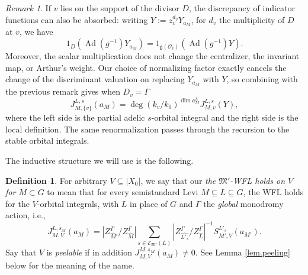 \documentclass[openany]{amsbook}
\theoremstyle{definition}
\newtheorem{definition}[theorem]{Definition}
\theoremstyle{remark}
\newtheorem{remark}[theorem]{Remark}
\numberwithin{equation}{section}
\renewcommand{\O}{\mathcal{O}}
\newcommand{\cE}{\mathcal{E}}
\renewcommand{\-}{\operatorname{-}}
\renewcommand{\a}{\mathfrak{a}}
\newcommand{\on}[1]{\operatorname{#1}}
\renewcommand{\fg}{\mathfrak{g}}
\newcommand{\fM}{\mathfrak{M}}
\newcommand{\Ad}{\on{Ad}}
\begin{document}
\begin{remark}\label{rmk.local.renorm.D}
    If $v$ lies on the support of the divisor $D$, the discrepancy of indicator functions can also be absorbed: writing $Y:= z_v^{d_v} Y_{a_M}$, for $d_v$ the multiplicity of $D$ at $v$, we have
    $$
        1_{D}(\Ad(g^{-1}) Y_{a_M}) = 1_{\fg(\O_v)}(\Ad(g^{-1}) Y).
    $$
    Moreover, the scalar multiplication does not change the centralizer, the invariant map, or Arthur's weight. Our choice of normalizing factor exactly cancels the change of the discriminant valuation on replacing $Y_{a_M}$ with $Y$, so combining with the previous remark gives when $D_v = \Gamma$
    $$
        J^{L,s}_{M, \{v\}}(a_M) = \deg(k_v/k_0)^{\dim \a^L_M} J_{M,v}^{L,s}(Y),
    $$
    where the left side is the partial adelic $s$-orbital integral and the right side is the local definition. The same renormalization passes through the recursion to the stable orbital integrals.
\end{remark}

The inductive structure we will use is the following.
\begin{definition}\label{def.global.wfl.V.places}
    For arbitrary $V \subseteq |X_0|$, we say that our \emph{the $\fM'$-WFL holds on $V$ for $M \subset G$} to mean that for every semistandard Levi $M \subseteq L \subseteq G$, the WFL holds for the $V$-orbital integrals, with $L$ in place of $G$ and $\Gamma$ the \emph{global} monodromy action, i.e.,
    \begin{equation}
        J^{L,{s_M}}_{M,V} (a_M) = |Z^\Gamma_{\widehat{M}'}/ Z_{\widehat{M}}^\Gamma| \sum_{s \in \cE_{\fM'}(L)} |Z_{\widehat{L'_s}}^\Gamma/ Z_{\widehat{L}}^\Gamma |^{-1} S_{M', V}^{L'_s}(a_{M'}).\label{eqn.V.wfl}
    \end{equation} 
    Say that $V$ is \emph{peelable} if in addition $J^{M,s_M}_{M, V}(a_M) \neq 0$. See Lemma \ref{lem.peeling} below for the meaning of the name.
\end{definition}
\end{document}
